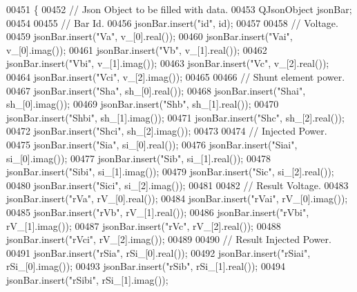 \begin{DoxyCode}
00451 \{
00452   \textcolor{comment}{// Json Object to be filled with data.}
00453   QJsonObject jsonBar;
00454 
00455   \textcolor{comment}{// Bar Id.}
00456   jsonBar.insert(\textcolor{stringliteral}{"id"}, \textcolor{keywordtype}{id});
00457 
00458   \textcolor{comment}{// Voltage.}
00459   jsonBar.insert(\textcolor{stringliteral}{"Va"}, v\_[0].real());
00460   jsonBar.insert(\textcolor{stringliteral}{"Vai"}, v\_[0].imag());
00461   jsonBar.insert(\textcolor{stringliteral}{"Vb"}, v\_[1].real());
00462   jsonBar.insert(\textcolor{stringliteral}{"Vbi"}, v\_[1].imag());
00463   jsonBar.insert(\textcolor{stringliteral}{"Vc"}, v\_[2].real());
00464   jsonBar.insert(\textcolor{stringliteral}{"Vci"}, v\_[2].imag());
00465 
00466   \textcolor{comment}{// Shunt element power.}
00467   jsonBar.insert(\textcolor{stringliteral}{"Sha"}, sh\_[0].real());
00468   jsonBar.insert(\textcolor{stringliteral}{"Shai"}, sh\_[0].imag());
00469   jsonBar.insert(\textcolor{stringliteral}{"Shb"}, sh\_[1].real());
00470   jsonBar.insert(\textcolor{stringliteral}{"Shbi"}, sh\_[1].imag());
00471   jsonBar.insert(\textcolor{stringliteral}{"Shc"}, sh\_[2].real());
00472   jsonBar.insert(\textcolor{stringliteral}{"Shci"}, sh\_[2].imag());
00473 
00474   \textcolor{comment}{// Injected Power.}
00475   jsonBar.insert(\textcolor{stringliteral}{"Sia"}, si\_[0].real());
00476   jsonBar.insert(\textcolor{stringliteral}{"Siai"}, si\_[0].imag());
00477   jsonBar.insert(\textcolor{stringliteral}{"Sib"}, si\_[1].real());
00478   jsonBar.insert(\textcolor{stringliteral}{"Sibi"}, si\_[1].imag());
00479   jsonBar.insert(\textcolor{stringliteral}{"Sic"}, si\_[2].real());
00480   jsonBar.insert(\textcolor{stringliteral}{"Sici"}, si\_[2].imag());
00481 
00482   \textcolor{comment}{// Result Voltage.}
00483   jsonBar.insert(\textcolor{stringliteral}{"rVa"}, rV\_[0].real());
00484   jsonBar.insert(\textcolor{stringliteral}{"rVai"}, rV\_[0].imag());
00485   jsonBar.insert(\textcolor{stringliteral}{"rVb"}, rV\_[1].real());
00486   jsonBar.insert(\textcolor{stringliteral}{"rVbi"}, rV\_[1].imag());
00487   jsonBar.insert(\textcolor{stringliteral}{"rVc"}, rV\_[2].real());
00488   jsonBar.insert(\textcolor{stringliteral}{"rVci"}, rV\_[2].imag());
00489 
00490   \textcolor{comment}{// Result Injected Power.}
00491   jsonBar.insert(\textcolor{stringliteral}{"rSia"}, rSi\_[0].real());
00492   jsonBar.insert(\textcolor{stringliteral}{"rSiai"}, rSi\_[0].imag());
00493   jsonBar.insert(\textcolor{stringliteral}{"rSib"}, rSi\_[1].real());
00494   jsonBar.insert(\textcolor{stringliteral}{"rSibi"}, rSi\_[1].imag());

\end{DoxyCode}
